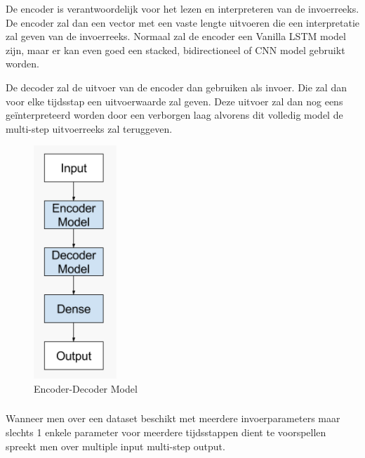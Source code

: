 De encoder is verantwoordelijk voor het lezen en interpreteren van de invoerreeks. De encoder zal dan een vector met een vaste lengte uitvoeren die een interpretatie zal geven van de invoerreeks. Normaal zal de encoder een Vanilla LSTM model zijn, maar er kan even goed een stacked, bidirectioneel of CNN model gebruikt worden.

De decoder zal de uitvoer van de encoder dan gebruiken als invoer. Die zal dan voor elke tijdsstap een uitvoerwaarde zal geven. Deze uitvoer zal dan nog eens ge\"{i}nterpreteerd worden door een verborgen laag alvorens dit volledig model de multi-step uitvoerreeks zal teruggeven.

\begin{figure}
    \centering
    \caption{Encoder-Decoder Model~\autocite{Brownlee2017a}}
    \label{fig:encoder_decoder_lstm}
    \includegraphics[width=0.15\linewidth]{encoder_decoder_lstm}
\end{figure}


\subsubsection{}

\paragraph{}

Wanneer men over een dataset beschikt met meerdere invoerparameters maar slechts 1 enkele parameter voor meerdere tijdsstappen dient te voorspellen spreekt men over multiple input multi-step output.

\paragraph{}

